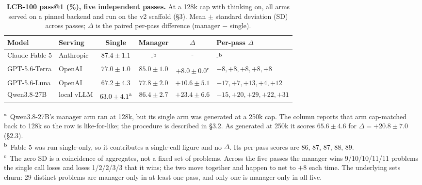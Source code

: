 \documentclass[11pt]{article}
\begin{document}
\begin{table}[htbp]
\centering
\caption{\textbf{LCB-100 pass@1 (\%), five independent passes.} At a 128k cap with thinking
on, all arms served on a pinned backend and run on the v2 scaffold (\S3). Mean $\pm$ standard
deviation (SD) across passes;
$\Delta$ is the paired per-pass difference (manager $-$ single).}
\small
\begin{tabular}{@{}llcccl@{}}
\toprule
\textbf{Model} & \textbf{Serving} & \textbf{Single} & \textbf{Manager} & \textbf{$\Delta$} &
\textbf{Per-pass $\Delta$} \\
\midrule
Claude Fable 5 & Anthropic & $\mathbf{87.4 \pm 1.1}$ & -\textsuperscript{b} & - & -\textsuperscript{b} \\
GPT-5.6-Terra & OpenAI & $77.0 \pm 1.0$ & $\mathbf{85.0 \pm 1.0}$ & $\mathbf{+8.0 \pm 0.0}$\textsuperscript{c} & $+8, +8, +8, +8, +8$ \\
GPT-5.6-Luna  & OpenAI & $67.2 \pm 4.3$ & $\mathbf{77.8 \pm 2.0}$ & $\mathbf{+10.6 \pm 5.1}$ & $+17, +7, +13, +4, +12$ \\
Qwen3.8-27B   & local vLLM & $63.0 \pm 4.1$\textsuperscript{a} & $\mathbf{86.4 \pm 2.7}$ & $\mathbf{+23.4 \pm 6.6}$ & $+15, +20, +29, +22, +31$ \\
\bottomrule
\end{tabular}

\vspace{0.6ex}
\begin{minipage}{0.92\linewidth}
\footnotesize
\textsuperscript{a}~Qwen3.8-27B's manager arm ran at 128k, but its single arm was
generated at a 250k cap. The
column reports that arm cap-matched back to 128k so the row is like-for-like; the procedure
is described in \S3.2. As generated at 250k it scores $65.6 \pm 4.6$ for
$\Delta = +20.8 \pm 7.0$ (\S2.3).\\
\textsuperscript{b}~Fable 5 was run single-only, so it contributes a single-call figure and
no $\Delta$. Its per-pass scores are 86, 87, 87, 88, 89.\\
\textsuperscript{c}~The zero SD is a coincidence of aggregates, not a fixed set of problems.
Across the five passes the manager wins 9/10/10/11/11 problems the single call loses and
loses 1/2/2/3/3 that it wins; the two move together and happen to net to $+8$ each time.
The underlying sets churn: 29 distinct problems are manager-only in at least one pass, and
only one is manager-only in all five.
\end{minipage}
\end{table}
\end{document}
